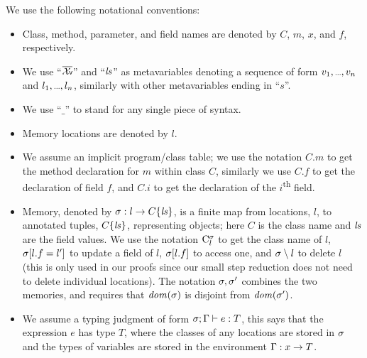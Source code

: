 We use the following notational conventions:
\begin{itemize}
	\item Class, method, parameter, and field names are denoted by $C$, $m$, $x$, and $f$, respectively.
	\item We use ``$\vs$'' and ``$\mathit{ls}$'' as metavariables denoting a sequence of form $\range{v}$ and $\range{l}$, similarly with other metavariables ending in ``$s$''.
	\item We use ``$\_$'' to stand for any single piece of syntax.
	\item Memory locations are denoted by $l$.
	\item We assume an implicit program/class table; we use the notation $C.m$ to get the method declaration for $m$ within class $C$, similarly we use $C.f$ to get the declaration of field $f$, and $C.i$ to get the declaration of the $i$\textsuperscript{th} field.
	\item Memory, denoted by $\sigma : l\rightarrow C\{\mathit{ls}\}$, is a finite map from locations, $l$, to annotated tuples, $C\{\mathit{ls}\}$, representing objects; here $C$ is the class name and $\mathit{ls}$ are the 
	field values.
	We use the notation $\mathrm{C}^{\sigma}_{l}$ to get the class name of $l$, $\sigma[l.f=l']$ to update a field of $l$, $\sigma[l.f]$ to access one, and $\sigma \setminus l$ to delete $l$ (this is only used in our proofs since our small step reduction does not need to delete individual locations). The notation $\sigma,\sigma'$ combines the two memories, and requires that $\mathit{dom}(\sigma)$ is disjoint from $\mathit{dom}(\sigma')$.
	\item We assume a typing judgment of form $\ty{e}{T}$, this says that the expression $e$ has type $T$,
	where the classes of any locations are stored in $\sigma$ and the types of variables are stored in the environment $\Gamma : x\rightarrow T$.
\end{itemize}

